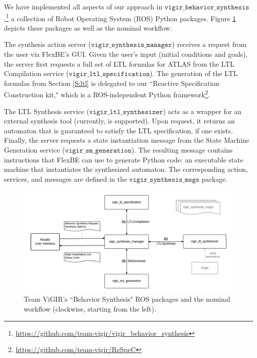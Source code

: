 
We have implemented all aspects of our approach in $\mathtt{vigir\_behavior\_synthesis}$,\footnote{\scriptsize{\url{https://github.com/team-vigir/vigir_behavior_synthesis}}}
 a collection of Robot Operating System (ROS) Python packages.
Figure \ref{Fig:vigir_behavior_synthesis} depicts these packages as well as the nominal workflow.

The synthesis action server ($\mathtt{vigir\_synthesis\_manager}$) receives a request from the user via FlexBE's GUI.
Given the user's input (initial conditions and goals), the server first requests a full set of LTL formulas for ATLAS from the LTL Compilation service ($\mathtt{vigir\_ltl\_specification}$).
The generation of the LTL formulas from Section \ref{S:ltl} is delegated to our ``Reactive Specification Construction kit," which is a ROS-independent Python framework\footnote{\scriptsize{\url{https://github.com/team-vigir/ReSpeC}}}.

The LTL Synthesis service ($\mathtt{vigir\_ltl\_synthesizer}$) acts as a wrapper for an external synthesis tool (currently, \cite{SLUGS} is supported).
Upon request, it returns an automaton that is guaranteed to satisfy the LTL specification, if one exists.
Finally, the server requests a state instantiation message from the State Machine Generation service ($\mathtt{vigir\_sm\_generation}$).
The resulting message contains instructions that FlexBE can use to generate Python code: an executable state machine that instantiates the synthesized automaton.
The corresponding action, services, and messages are defined in the $\mathtt{vigir\_synthesis\_msgs}$ package.

\begin{figure}[t]
\centering
\includegraphics[width=0.99\columnwidth,clip]{./img/behavior_synthesis_packages.png}
\caption{Team ViGIR's ``Behavior Synthesis" ROS packages and the nominal workflow (clockwise, starting from the left).
}
\label{Fig:vigir_behavior_synthesis}
\end{figure}
